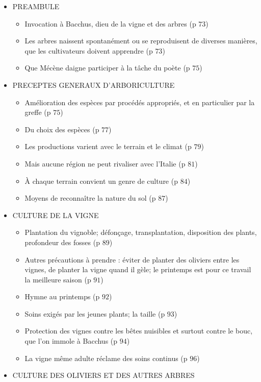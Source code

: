 \documentclass[a4paper, 11pt, hidelinks]{article}
\begin{document}
\begin{itemize}
    \item PREAMBULE \begin{itemize}
        \item Invocation à Bacchus, dieu de la vigne et des arbres (p $73$)
        \item Les arbres naissent spontanément ou se reproduisent de diverses manières, que les cultivateurs doivent apprendre (p $73$)
        \item Que Mécène daigne participer à la tâche du poète (p $75$)
    \end{itemize}
    \item PRECEPTES GENERAUX D'ARBORICULTURE \begin{itemize}
        \item Amélioration des espèces par procédés appropriés, et en particulier par la greffe (p $75$)
        \item Du choix des espèces (p $77$)
        \item Les productions varient avec le terrain et le climat (p $79$)
        \item Mais aucune région ne peut rivaliser avec l'Italie (p $81$)
        \item À chaque terrain convient un genre de culture (p $84$)
        \item Moyens de reconnaître la nature du sol (p $87$)
    \end{itemize}
    \item CULTURE DE LA VIGNE \begin{itemize}
        \item Plantation du vignoble; défonçage, transplantation, disposition des plants, profondeur des fosses (p $89$)
        \item Autres précautions à prendre : éviter de planter des oliviers entre les vignes, de planter la vigne quand il gèle; le printemps est pour ce travail la meilleure saison (p $91$)
        \item Hymne au printemps (p $92$)
        \item Soins exigés par les jeunes plants; la taille (p $93$)
        \item Protection des vignes contre les bêtes nuisibles et surtout contre le bouc, que l'on immole à Bacchus (p $94$)
        \item La vigne même adulte réclame des soins continus (p $96$)
    \end{itemize}
    \item CULTURE DES OLIVIERS ET DES AUTRES ARBRES \begin{itemize}

\end{itemize}
\end{itemize}
\end{document}
